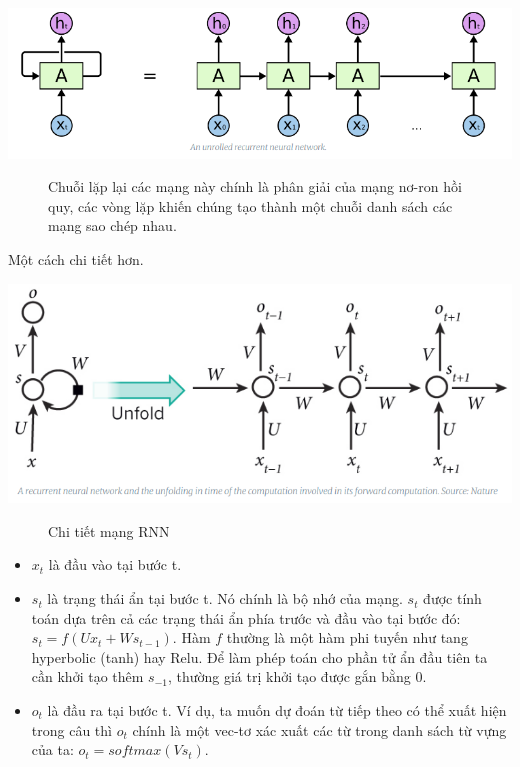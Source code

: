 \begin{center}
    \includegraphics[scale=.5]{image/chapter6/RNN-ab.png}
    \begin{figure}[htp]
    \begin{center}
     
    \end{center}
    \caption{Chuỗi lặp lại các mạng này chính là phân giải của mạng nơ-ron hồi quy, các vòng lặp khiến chúng tạo thành một chuỗi danh sách các mạng sao chép nhau. \cite{rnn-basic}}
    \end{figure}
\end{center}
Một cách chi tiết hơn.
\begin{center}
    \includegraphics[scale=.4]{image/chapter6/rnn-detail.png}
    \begin{figure}[htp]
    \begin{center}
     
    \end{center}
    \caption{Chi tiết mạng RNN \cite{rnn-basic}}
    \end{figure}
\end{center}
\begin{itemize}
    \item $x_{t}$ là đầu vào tại bước t.
    \item $s_{t}$ là trạng thái ẩn tại bước t. Nó chính là bộ nhớ của mạng. $s_{t}$ được tính toán dựa trên cả các trạng thái ẩn phía trước và đầu vào tại bước đó: $s_{t} = f(Ux_{t}+Ws_{t-1})$. Hàm $f$ thường là một hàm phi tuyến như tang hyperbolic (tanh) hay Relu. Để làm phép toán cho phần tử ẩn đầu tiên ta cần khởi tạo thêm $s_{-1}$, thường giá trị khởi tạo được gắn bằng 0.
    \item $o_{t}$ là đầu ra tại bước t. Ví dụ, ta muốn dự đoán từ tiếp theo có thể xuất hiện trong câu thì $o_{t}$ chính là một vec-tơ xác xuất các từ trong danh sách từ vựng của ta: $o_{t} = softmax(Vs_{t})$. 
\end{itemize}


